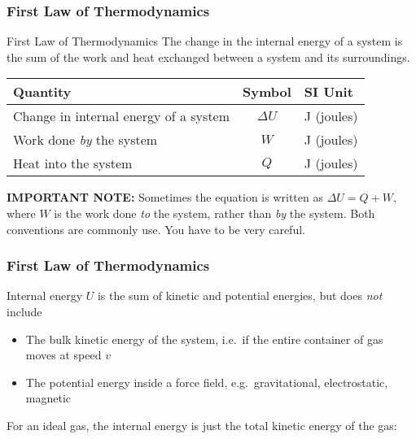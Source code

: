 \documentclass[12pt,aspectratio=169]{beamer}
\newcommand{\eq}[2]{\vspace{#1}{\Large\begin{displaymath}#2\end{displaymath}}}
\begin{document}
\begin{frame}
  \frametitle{First Law of Thermodynamics}
  \begin{block}{First Law of Thermodynamics}
    The change in the internal energy of a system is the sum of the work and
    heat exchanged between a system and its surroundings. 
  \end{block}
  
  \eq{-.2in}{
    \boxed{\Delta U=Q-W}
  }
  \begin{center}
    \begin{tabular}{l|c|l}
      \rowcolor{pink}
      \textbf{Quantity} & \textbf{Symbol} & \textbf{SI Unit} \\ \hline
      Change in internal energy of a system & $\Delta U$ & \si{J} (joules) \\
      Work done \emph{by} the system & $W$                 & \si{J} (joules) \\
      Heat into the system           & $Q$                 & \si{J} (joules)
    \end{tabular}
  \end{center}
  
  {\footnotesize
    \textbf{IMPORTANT NOTE:} Sometimes the equation is written as
    $\Delta U=Q+W$, where $W$ is the work done \emph{to} the system, rather
    than \emph{by} the system. Both conventions are commonly use. You have to
    be very careful.\par
  }
\end{frame}


\begin{frame}
  \frametitle{First Law of Thermodynamics}
  
  Internal energy $U$ is the sum of kinetic and potential energies, but does
  \emph{not} include
  \begin{itemize}
  \item The bulk kinetic energy of the system, i.e.\ if the entire container
    of gas moves at speed $v$
  \item The potential energy inside a force field, e.g.\ gravitational,
    electrostatic, magnetic
  \end{itemize}
  For an ideal gas, the internal energy is just the total kinetic energy of the
  gas:

  \eq{-.2in}{
    U=K=\frac{3}{2}NkT=\frac{3}{2}nRT
  }
\end{frame}
\end{document}
